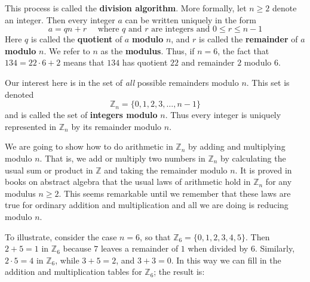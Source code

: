 This process is called the \textbf{division algorithm}. More formally, let $n \geq 2$ denote an integer. Then every integer $a$ can be written uniquely in the form
\begin{equation*}
a = qn + r \quad \mbox{ where } q \mbox{ and } r \mbox{ are integers and } 0 \le r \le n - 1
\end{equation*}
Here $q$ is called the \textbf{quotient} of $a$ \textbf{modulo} $n$, and $r$ is called the \textbf{remainder} of $a$ \textbf{modulo} $n$. We refer to $n$ as the \textbf{modulus}. Thus, if $n = 6$, the fact that $134 = 22 \cdot 6 + 2$ means that $134$ has quotient $22$ and remainder $2$ modulo $6$.

Our interest here is in the set of \textit{all} possible remainders modulo $n$. This set is denoted
\begin{equation*}
\mathbb{Z}_{n} = \{0, 1, 2, 3, \dots, n-1\}
\end{equation*}
and is called the set of \textbf{integers modulo} $n$. Thus every integer is uniquely represented in $\mathbb{Z}_n$ by its remainder modulo $n$.

We are going to show how to do arithmetic in $\mathbb{Z}_n$ by adding and multiplying modulo $n$. That is, we add or multiply two numbers in $\mathbb{Z}_n$ by calculating the usual sum or product in $\mathbb{Z}$  and taking the remainder modulo $n$. It is proved in books on abstract algebra that the usual laws of arithmetic hold in $\mathbb{Z}_n$ for any modulus $n \geq 2$. This seems remarkable until we remember that these laws are true for ordinary addition and multiplication and all we are doing is reducing modulo $n$.

To illustrate, consider the case $n = 6$, so that $\mathbb{Z}_6 = \{0, 1, 2, 3, 4, 5\}$. Then $2 + 5 = 1$ in $\mathbb{Z}_6$ because $7$ leaves a remainder of $1$ when divided by $6$. Similarly, $2 \cdot 5 = 4$ in $\mathbb{Z}_6$, while $3 + 5 = 2$, and $3 + 3 = 0$. In this way we can fill in the addition and multiplication tables for $\mathbb{Z}_6$; the result is:

